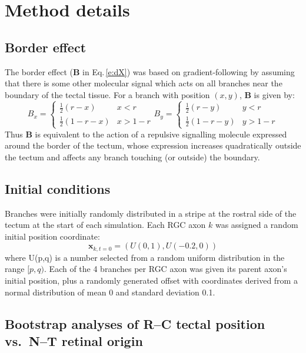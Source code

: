\documentclass[9pt,lineno]{elife}
\begin{document}
\section{Method details}

\subsection*{Border effect} %
The border effect ($\mathbf{B}$ in Eq.\,\ref{e:dX}) was based on gradient-following by assuming that there is some other molecular signal which acts on all branches near the boundary of the tectal tissue. For a branch with position $(x,y)$, $\mathbf{B}$ is given by:
%
\begin{equation}\label{e:B}
B_x = \begin{cases}
        \frac{1}{2} (r-x)     & x<r \\
        \frac{1}{2} (1-r-x)    & x>1-r
\end{cases}
B_y = \begin{cases}
        \frac{1}{2} (r-y)      & y<r \\
        \frac{1}{2} (1-r-y)    & y>1-r
\end{cases}
\end{equation}
%
Thus $\mathbf{B}$ is equivalent to the action of a repulsive signalling molecule expressed around the border of the tectum, whose expression increases quadratically outside the tectum and affects any branch touching (or outside) the boundary.

\subsection*{Initial conditions}
Branches were initially randomly distributed in a stripe at the rostral side of the tectum at the start of each simulation. 
Each RGC axon $k$ was assigned a random initial position coordinate:
\begin{equation}\label{e:ic}
\mathbf{x}_{k,t=0} = (U(0,1), U(-0.2,0))
\end{equation}
where U(p,q) is a number selected from a random uniform distribution in the range $[p,q)$. Each of the 4 branches per RGC axon was given its parent axon's initial position, plus a randomly generated offset with coordinates derived from a normal distribution of mean 0 and standard deviation 0.1.

\subsection*{Bootstrap analyses of R--C tectal position vs.~N--T retinal origin}
\end{document}
